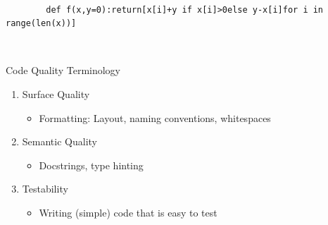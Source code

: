 
\begin{darkframe}
  \begin{center}
    \\[1.5em]
    \begin{minipage}{0.8\textwidth}
      \begin{verbatim}
        def f(x,y=0):return[x[i]+y if x[i]>0else y-x[i]for i in range(len(x))]
      \end{verbatim}
    \end{minipage}
    \\[3em]
  \end{center}

\end{darkframe}

\begin{darkframe}{Code Quality Terminology}
  \Huge
  \begin{enumerate}
    \setlength{\itemsep}{2em}
    \item \textcolor{ccyan}{Surface Quality}
      \begin{itemize}
        \item [\to] Formatting: Layout, naming conventions, whitespaces
      \end{itemize}
    \item \textcolor{ccyan}{Semantic Quality}
      \begin{itemize}
        \item [\to] Docstrings, type hinting
      \end{itemize}
    \item \textcolor{ccyan}{Testability}
      \begin{itemize}
        \item [\to] Writing (simple) code that is easy to test
      \end{itemize}
  \end{enumerate}
\end{darkframe}


